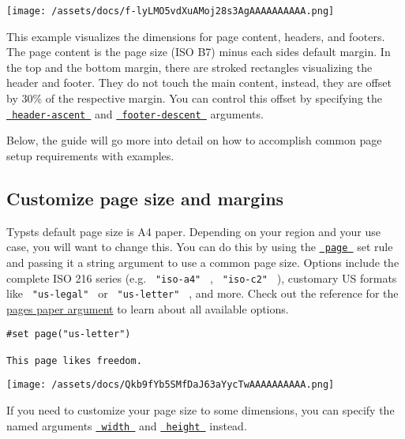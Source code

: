 \texttt{[image: /assets/docs/f-lyLMO5vdXuAMoj28s3AgAAAAAAAAAA.png]}

This example visualizes the dimensions for page content, headers, and
footers. The page content is the page size (ISO B7) minus each
side\textquotesingle s default margin. In the top and the bottom margin,
there are stroked rectangles visualizing the header and footer. They do
not touch the main content, instead, they are offset by 30\% of the
respective margin. You can control this offset by specifying the
\href{/docs/reference/layout/page/\#parameters-header-ascent}{\texttt{\ header-ascent\ }}
and
\href{/docs/reference/layout/page/\#parameters-footer-descent}{\texttt{\ footer-descent\ }}
arguments.

Below, the guide will go more into detail on how to accomplish common
page setup requirements with examples.

\subsection{Customize page size and margins}\label{customize-margins}

Typst\textquotesingle s default page size is A4 paper. Depending on your
region and your use case, you will want to change this. You can do this
by using the \href{/docs/reference/layout/page/}{\texttt{\ page\ }} set
rule and passing it a string argument to use a common page size. Options
include the complete ISO 216 series (e.g. \texttt{\ "iso-a4"\ } ,
\texttt{\ "iso-c2"\ } ), customary US formats like
\texttt{\ "us-legal"\ } or \texttt{\ "us-letter"\ } , and more. Check
out the reference for the
\href{/docs/reference/layout/page/\#parameters-paper}{page\textquotesingle s
paper argument} to learn about all available options.

\begin{verbatim}
#set page("us-letter")

This page likes freedom.
\end{verbatim}

\texttt{[image: /assets/docs/Qkb9fYb5SMfDaJ63aYycTwAAAAAAAAAA.png]}

If you need to customize your page size to some dimensions, you can
specify the named arguments
\href{/docs/reference/layout/page/\#parameters-width}{\texttt{\ width\ }}
and
\href{/docs/reference/layout/page/\#parameters-height}{\texttt{\ height\ }}
instead.

